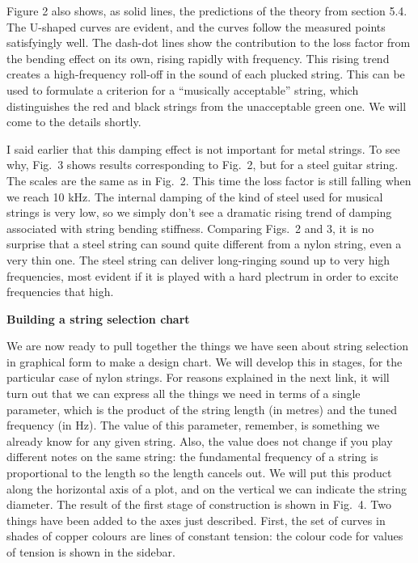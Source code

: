
  Figure 2 also shows, as solid lines, the predictions of the theory from 
  section 5.4. The U-shaped curves are evident, and the curves follow the 
  measured points satisfyingly well. The dash-dot lines show the contribution 
  to the loss factor from the bending effect on its own, rising rapidly with 
  frequency. This rising trend creates a high-frequency roll-off in the sound 
  of each plucked string. This can be used to formulate a criterion for a 
  ``musically acceptable'' string, which distinguishes the red and black 
  strings from the unacceptable green one. We will come to the details shortly. 

  I said earlier that this damping effect is not important for metal strings. 
  To see why, Fig.\ 3 shows results corresponding to Fig.\ 2, but for a steel 
  guitar string. The scales are the same as in Fig.\ 2. This time the loss 
  factor is still falling when we reach 10 kHz. The internal damping of the 
  kind of steel used for musical strings is very low, so we simply don't see a 
  dramatic rising trend of damping associated with string bending stiffness. 
  Comparing Figs.\ 2 and 3, it is no surprise that a steel string can sound 
  quite different from a nylon string, even a very thin one. The steel string 
  can deliver long-ringing sound up to very high frequencies, most evident if 
  it is played with a hard plectrum in order to excite frequencies that high. 


  \textbf{Building a string selection chart} 

  We are now ready to pull together the things we have seen about string 
  selection in graphical form to make a design chart. We will develop this in 
  stages, for the particular case of nylon strings. For reasons explained in 
  the next link, it will turn out that we can express all the things we need in 
  terms of a single parameter, which is the product of the string length (in 
  metres) and the tuned frequency (in Hz). The value of this parameter, 
  remember, is something we already know for any given string. Also, the value 
  does not change if you play different notes on the same string: the 
  fundamental frequency of a string is proportional to the length so the length 
  cancels out. We will put this product along the horizontal axis of a plot, 
  and on the vertical we can indicate the string diameter. The result of the 
  first stage of construction is shown in Fig.\ 4. Two things have been added 
  to the axes just described. First, the set of curves in shades of copper 
  colours are lines of constant tension: the colour code for values of tension 
  is shown in the sidebar. 


